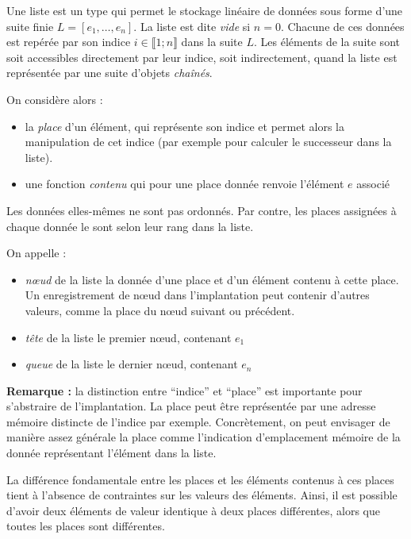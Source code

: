 \documentclass[../../../main.tex]{subfiles}
\begin{document}
Une liste est un type qui permet le stockage linéaire de données sous forme d'une suite finie $L = [e_1, \dots, e_n]$. La liste est dite \textit{vide} si $n = 0$. Chacune de ces données est repérée par son indice $i\in\llbracket 1;n \rrbracket$ dans la suite $L$. Les éléments de la suite sont soit accessibles directement par leur indice, soit indirectement, quand la liste est représentée par une suite d'objets \textit{chaînés}.

On considère alors :
\begin{itemize}
	\item la \textit{place} d'un élément, qui représente son indice et permet alors la manipulation de cet indice (par exemple pour calculer le successeur dans la liste).
	\item une fonction \textit{contenu} qui pour une place donnée renvoie l'élément $e$ associé
\end{itemize}
Les données elles-mêmes ne sont pas ordonnés. Par contre, les places assignées à chaque donnée le sont selon leur rang dans la liste.

On appelle :
\begin{itemize}
	\item \textit{n\oe{}ud} de la liste la donnée d'une place et d'un élément contenu à cette place. Un enregistrement de n\oe{}ud dans l'implantation peut contenir d'autres valeurs, comme la place du n\oe{}ud suivant ou précédent.
	\item \textit{tête} de la liste le premier n\oe{}ud, contenant $e_1$
	\item \textit{queue} de la liste le dernier n\oe{}ud, contenant $e_n$
\end{itemize}
\textbf{Remarque :} la distinction entre ``indice'' et ``place'' est importante pour s'abstraire de l'implantation. La place peut être représentée par une adresse mémoire distincte de l'indice par exemple. Concrètement, on peut envisager de manière assez générale la place comme l'indication d'emplacement mémoire de la donnée représentant l'élément dans la liste.

\begin{minipage}{\textwidth}
	\begin{center}
		
	\end{center}
\end{minipage}

La différence fondamentale entre les places et les éléments contenus à ces places tient à l'absence de contraintes sur les valeurs des éléments. Ainsi, il est possible d'avoir deux éléments de valeur identique à deux places différentes, alors que toutes les places sont différentes.
\end{document}

